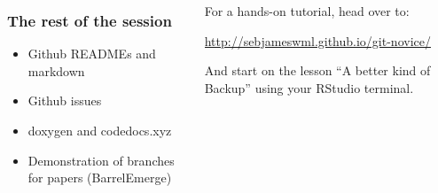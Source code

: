 \documentclass{beamer}
\begin{document}
\begin{frame}
  \begin{columns}[T]
    \begin{column}{.5\textwidth}
      \frametitle{The rest of the session}
      \begin{itemize}
      \item Github READMEs and markdown
      \item Github issues
      \item doxygen and codedocs.xyz
      \item Demonstration of branches for papers (BarrelEmerge)
      \end{itemize}
    \end{column}
    \begin{column}{.5\textwidth}

      For a hands-on tutorial, head over to:

      \url{http://sebjameswml.github.io/git-novice/}

      And start on the lesson ``A better kind of Backup'' using your RStudio
      terminal.
    \end{column}
  \end{columns}
\end{frame}
\end{document}
